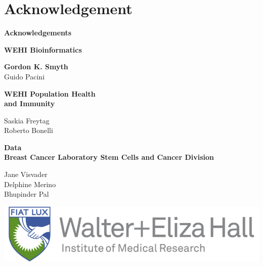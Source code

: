 \documentclass[9pt,t]{beamer}
\begin{document}
\section{Acknowledgement}
\begin{frame}[plain,t]
	\vspace{0.7cm}
	\textbf{\huge{Acknowledgements}}\\
	\vspace{1cm}
	
	\begin{minipage}[t]{0.49\textwidth}
	{\color{oxygenpurple}\textbf{WEHI Bioinformatics}}\\
	\vspace{0.20cm}
	
	\textbf{Gordon K. Smyth}\\
	Guido Pacini\\
	\vspace{0.35cm}
	
	{\color{oxygenpurple}\textbf{WEHI Population Health \\and Immunity}}\\
	\vspace{0.20cm}
	
	Saskia Freytag\\
	Roberto Bonelli\\
	\vspace{0.7cm}
	\end{minipage}%
	\begin{minipage}[t]{0.49\textwidth}
	{\color{oxygenpurple}\textbf{Data}}\\	
	{\color{oxygenrose}\textbf{Breast Cancer Laboratory Stem Cells and Cancer Division}}\\
	\vspace{0.20cm}
	
	Jane Visvader\\
	Delphine Merino\\
	Bhupinder Pal
	\vspace{0.75cm}
	
	\includegraphics[width=1\textwidth]{WEHI}
	\vspace{1.35cm}
	
	
	\end{minipage}
\end{frame}

\end{document}
